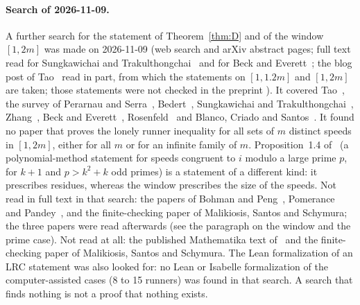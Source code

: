 \documentclass[11pt]{article}
\theoremstyle{remark}
\begin{document}
\paragraph{Search of 2026-11-09.} A further search for the statement of Theorem~\ref{thm:D} and of the window $[1,2m]$ was made on 2026-11-09 (web search and arXiv abstract pages; full text read for Sungkawichai and Trakulthongchai~\cite{ST26} and for Beck and Everett~\cite{BE26}; the blog post of Tao~\cite{TaoBlog} read in part, from which the statements on $[1,1.2m]$ and $[1,2m]$ are taken; those statements were not checked in the preprint \cite{Tao17}). It covered Tao~\cite{Tao17}, the survey of Perarnau and Serra~\cite{PS25}, Bedert~\cite{Bed25}, Sungkawichai and Trakulthongchai~\cite{ST26}, Zhang~\cite{Zha26}, Beck and Everett~\cite{BE26}, Rosenfeld~\cite{Ros25} and Blanco, Criado and Santos~\cite{BCS26}. It found no paper that proves the lonely runner inequality for all sets of $m$ distinct speeds in $[1,2m]$, either for all $m$ or for an infinite family of $m$. Proposition~1.4 of~\cite{ST26} (a polynomial-method statement for speeds congruent to $i$ modulo a large prime $p$, for $k+1$ and $p>k^2+k$ odd primes) is a statement of a different kind: it prescribes residues, whereas the window prescribes the size of the speeds. Not read in full text in that search: the papers of Bohman and Peng~\cite{BP22}, Pomerance~\cite{Pomerance22} and Pandey~\cite{Pandey10}, and the finite-checking paper of Malikiosis, Santos and Schymura; the three papers were read afterwards (see the paragraph on the window and the prime case). Not read at all: the published Mathematika text of~\cite{BP22} and the finite-checking paper of Malikiosis, Santos and Schymura. The Lean formalization of an LRC statement was also looked for: no Lean or Isabelle formalization of the computer-assisted cases (8 to 15 runners) was found in that search. A search that finds nothing is not a proof that nothing exists.



\end{document}
